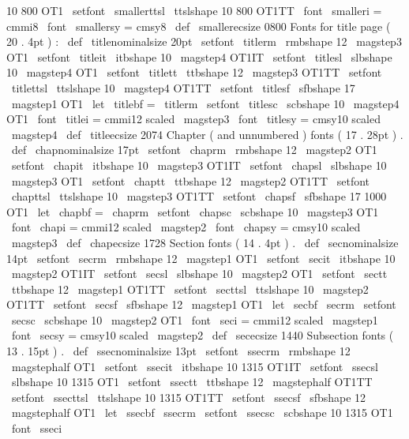 {{{{10
}
{
800
}
{
OT1
}
\
setfont
\
smallerttsl
\
ttslshape
{
10
}
{
800
}
{
OT1TT
}
\
font
\
smalleri
=
cmmi8
\
font
\
smallersy
=
cmsy8
\
def
\
smallerecsize
{
0800
}
%
Fonts
for
title
page
(
20
.
4pt
)
:
\
def
\
titlenominalsize
{
20pt
}
\
setfont
\
titlerm
\
rmbshape
{
12
}
{
\
magstep3
}
{
OT1
}
\
setfont
\
titleit
\
itbshape
{
10
}
{
\
magstep4
}
{
OT1IT
}
\
setfont
\
titlesl
\
slbshape
{
10
}
{
\
magstep4
}
{
OT1
}
\
setfont
\
titlett
\
ttbshape
{
12
}
{
\
magstep3
}
{
OT1TT
}
\
setfont
\
titlettsl
\
ttslshape
{
10
}
{
\
magstep4
}
{
OT1TT
}
\
setfont
\
titlesf
\
sfbshape
{
17
}
{
\
magstep1
}
{
OT1
}
\
let
\
titlebf
=
\
titlerm
\
setfont
\
titlesc
\
scbshape
{
10
}
{
\
magstep4
}
{
OT1
}
\
font
\
titlei
=
cmmi12
scaled
\
magstep3
\
font
\
titlesy
=
cmsy10
scaled
\
magstep4
\
def
\
titleecsize
{
2074
}
%
Chapter
(
and
unnumbered
)
fonts
(
17
.
28pt
)
.
\
def
\
chapnominalsize
{
17pt
}
\
setfont
\
chaprm
\
rmbshape
{
12
}
{
\
magstep2
}
{
OT1
}
\
setfont
\
chapit
\
itbshape
{
10
}
{
\
magstep3
}
{
OT1IT
}
\
setfont
\
chapsl
\
slbshape
{
10
}
{
\
magstep3
}
{
OT1
}
\
setfont
\
chaptt
\
ttbshape
{
12
}
{
\
magstep2
}
{
OT1TT
}
\
setfont
\
chapttsl
\
ttslshape
{
10
}
{
\
magstep3
}
{
OT1TT
}
\
setfont
\
chapsf
\
sfbshape
{
17
}
{
1000
}
{
OT1
}
\
let
\
chapbf
=
\
chaprm
\
setfont
\
chapsc
\
scbshape
{
10
}
{
\
magstep3
}
{
OT1
}
\
font
\
chapi
=
cmmi12
scaled
\
magstep2
\
font
\
chapsy
=
cmsy10
scaled
\
magstep3
\
def
\
chapecsize
{
1728
}
%
Section
fonts
(
14
.
4pt
)
.
\
def
\
secnominalsize
{
14pt
}
\
setfont
\
secrm
\
rmbshape
{
12
}
{
\
magstep1
}
{
OT1
}
\
setfont
\
secit
\
itbshape
{
10
}
{
\
magstep2
}
{
OT1IT
}
\
setfont
\
secsl
\
slbshape
{
10
}
{
\
magstep2
}
{
OT1
}
\
setfont
\
sectt
\
ttbshape
{
12
}
{
\
magstep1
}
{
OT1TT
}
\
setfont
\
secttsl
\
ttslshape
{
10
}
{
\
magstep2
}
{
OT1TT
}
\
setfont
\
secsf
\
sfbshape
{
12
}
{
\
magstep1
}
{
OT1
}
\
let
\
secbf
\
secrm
\
setfont
\
secsc
\
scbshape
{
10
}
{
\
magstep2
}
{
OT1
}
\
font
\
seci
=
cmmi12
scaled
\
magstep1
\
font
\
secsy
=
cmsy10
scaled
\
magstep2
\
def
\
sececsize
{
1440
}
%
Subsection
fonts
(
13
.
15pt
)
.
\
def
\
ssecnominalsize
{
13pt
}
\
setfont
\
ssecrm
\
rmbshape
{
12
}
{
\
magstephalf
}
{
OT1
}
\
setfont
\
ssecit
\
itbshape
{
10
}
{
1315
}
{
OT1IT
}
\
setfont
\
ssecsl
\
slbshape
{
10
}
{
1315
}
{
OT1
}
\
setfont
\
ssectt
\
ttbshape
{
12
}
{
\
magstephalf
}
{
OT1TT
}
\
setfont
\
ssecttsl
\
ttslshape
{
10
}
{
1315
}
{
OT1TT
}
\
setfont
\
ssecsf
\
sfbshape
{
12
}
{
\
magstephalf
}
{
OT1
}
\
let
\
ssecbf
\
ssecrm
\
setfont
\
ssecsc
\
scbshape
{
10
}
{
1315
}
{
OT1
}
\
font
\
sseci
}}}
